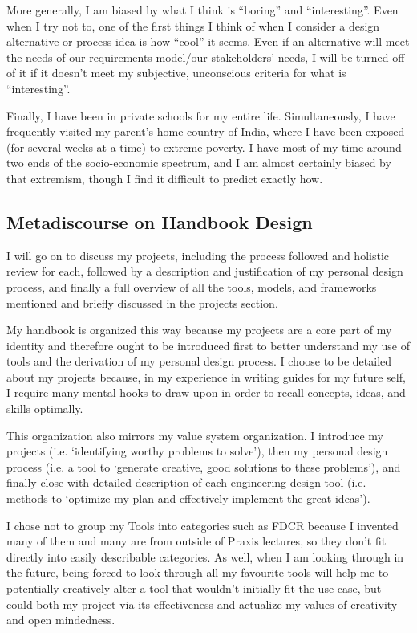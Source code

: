 \documentclass[a4paper,12pt]{article}
\begin{document}
More generally, I am biased by what I think is “boring” and “interesting”. Even when I try not to, one of the first things I think of when I consider a design alternative or process idea is how “cool” it seems. Even if an alternative will meet the needs of our requirements model/our stakeholders’ needs, I will be turned off of it if it doesn’t meet my subjective, unconscious criteria for what is “interesting”.

Finally, I have been in private schools for my entire life. Simultaneously, I have frequently visited my parent’s home country of India, where I have been exposed (for several weeks at a time) to extreme poverty. I have most of my time around two ends of the socio-economic spectrum, and I am almost certainly biased by that extremism, though I find it difficult to predict exactly how.

\subsection{Metadiscourse on Handbook Design}
I will go on to discuss my projects, including the process followed and holistic review for each, followed by a description and justification of my personal design process, and finally a full overview of all the tools, models, and frameworks mentioned and briefly discussed in the projects section.

My handbook is organized this way because my projects are a core part of my identity and therefore ought to be introduced first to better understand my use of tools and the derivation of my personal design process. I choose to be detailed about my projects because, in my experience in writing guides for my future self, I require many mental hooks to draw upon in order to recall concepts, ideas, and skills optimally.

This organization also mirrors my value system organization. I introduce my projects (i.e. ‘identifying worthy problems to solve’), then my personal design process (i.e. a tool to ‘generate creative, good solutions to these problems’), and finally close with detailed description of each engineering design tool (i.e. methods to ‘optimize my plan and effectively implement the great ideas’).

I chose not to group my Tools into categories such as FDCR because I invented many of them and many are from outside of Praxis lectures, so they don’t fit directly into easily describable categories. As well, when I am looking through in the future, being forced to look through all my favourite tools will help me to potentially creatively alter a tool that wouldn’t initially fit the use case, but could both my project via its effectiveness and actualize my values of creativity and open mindedness.
\end{document}
